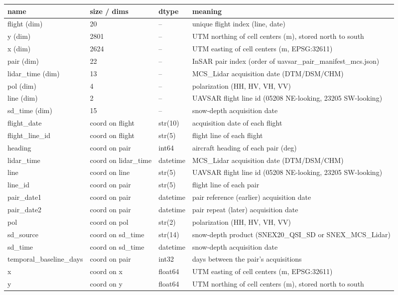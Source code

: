 \begin{tabular}{llll}
\hline
name & size / dims & dtype & meaning \\
\hline
flight (dim) & 20 & -- & unique flight index (line, date) \\
y (dim) & 2801 & -- & UTM northing of cell centers (m), stored north to south \\
x (dim) & 2624 & -- & UTM easting of cell centers (m, EPSG:32611) \\
pair (dim) & 22 & -- & InSAR pair index (order of uavsar\_pair\_manifest\_mcs.json) \\
lidar\_time (dim) & 13 & -- & MCS\_Lidar acquisition date (DTM/DSM/CHM) \\
pol (dim) & 4 & -- & polarization (HH, HV, VH, VV) \\
line (dim) & 2 & -- & UAVSAR flight line id (05208 NE-looking, 23205 SW-looking) \\
sd\_time (dim) & 15 & -- & snow-depth acquisition date \\
flight\_date & coord on flight & str(10) & acquisition date of each flight \\
flight\_line\_id & coord on flight & str(5) & flight line of each flight \\
heading & coord on pair & int64 & aircraft heading of each pair (deg) \\
lidar\_time & coord on lidar\_time & datetime & MCS\_Lidar acquisition date (DTM/DSM/CHM) \\
line & coord on line & str(5) & UAVSAR flight line id (05208 NE-looking, 23205 SW-looking) \\
line\_id & coord on pair & str(5) & flight line of each pair \\
pair\_date1 & coord on pair & datetime & pair reference (earlier) acquisition date \\
pair\_date2 & coord on pair & datetime & pair repeat (later) acquisition date \\
pol & coord on pol & str(2) & polarization (HH, HV, VH, VV) \\
sd\_source & coord on sd\_time & str(14) & snow-depth product (SNEX20\_QSI\_SD or SNEX\_MCS\_Lidar) \\
sd\_time & coord on sd\_time & datetime & snow-depth acquisition date \\
temporal\_baseline\_days & coord on pair & int32 & days between the pair's acquisitions \\
x & coord on x & float64 & UTM easting of cell centers (m, EPSG:32611) \\
y & coord on y & float64 & UTM northing of cell centers (m), stored north to south \\
\hline
\end{tabular}
